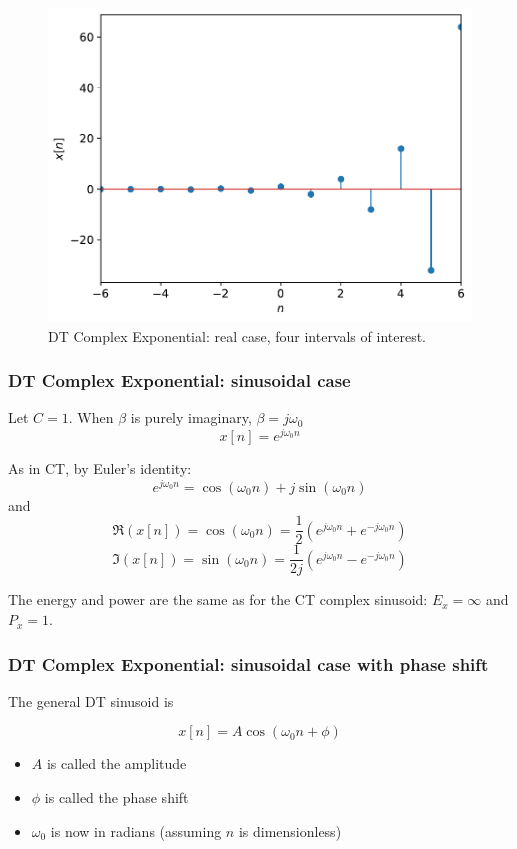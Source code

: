 \begin{figure}[ht]
\includegraphics[scale=0.5]{graphics/dtexpcase4.pdf}
\caption{ DT Complex Exponential: real case, four intervals of interest.}
\label{fig:dtexpreal}
\end{figure}

\subsubsection{DT Complex Exponential: sinusoidal case}

Let $C = 1$. When $\beta$ is purely imaginary, $\beta = j\omega_0$
\[
x[n] = e^{j\omega_0 n}
\]

As in CT, by Euler's identity:
\[
e^{j\omega_0 n} = \cos(\omega_0 n) + j\sin(\omega_0 n)
\]
and
\[
\Re(x[n]) = \cos(\omega_0 n) = \frac{1}{2}\left( e^{j\omega_0 n} + e^{-j\omega_0 n} \right)
\]
\[
\Im(x[n]) = \sin(\omega_0 n) = \frac{1}{2j}\left( e^{j\omega_0 n} - e^{-j\omega_0 n} \right)
\]

The energy and power are the same as for the CT complex sinusoid: $E_x = \infty$ and $P_x = 1$.


\subsubsection{DT Complex Exponential: sinusoidal case with phase shift}

The general DT sinusoid is

\[
x[n] = A\cos(\omega_0 n + \phi)
\]

\begin{itemize}
\item $A$ is called the amplitude
\item $\phi$ is called the phase shift
\item $\omega_0$ is now in radians (assuming $n$ is dimensionless)
\end{itemize}

